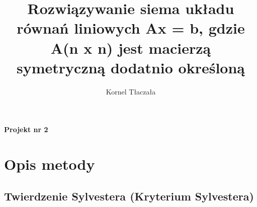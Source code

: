 \documentclass{article}
\title{Rozwiązywanie siema układu równań liniowych Ax = b, gdzie A(n x n) jest macierzą symetryczną dodatnio określoną}
\author{Kornel Tłaczała}
\begin{document}
\maketitle

\vspace{0.2cm}
\begin{center}
\textbf{\large Projekt nr 2} \\
\end{center}

\section{Opis metody}
    \subsection*{Twierdzenie Sylvestera (Kryterium Sylvestera)}

\vspace{10pt}
\end{document}
